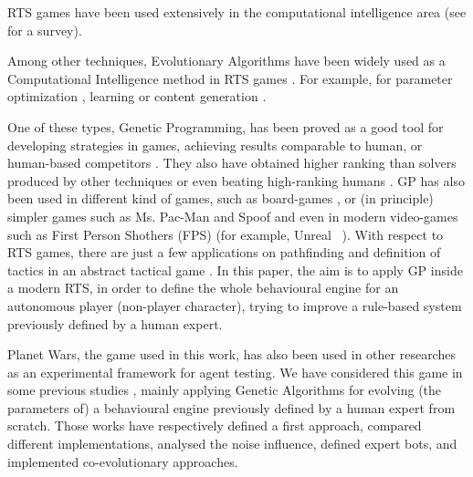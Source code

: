 \documentclass[preprint]{elsarticle}
\begin{document}
RTS games have been used extensively in the computational intelligence area (see \cite{Lara2013review} for a survey). 

Among other techniques, Evolutionary Algorithms have been widely used as a  Computational Intelligence method in RTS games \cite{Lara2013review}. For example, for parameter optimization \cite{Esparcia10FPS}, learning \cite{Kenneth2005neuroevolution} or content generation \cite{Mahlmann2012MapGeneration}. 

One of these types, Genetic Programming, has been proved as a good tool for developing strategies in games, achieving results comparable to human, or human-based competitors \cite{Sipper2007gameplaying}. They also have obtained higher ranking than solvers produced by other techniques or even beating high-ranking humans \cite{Elyasaf2012FreeCell}. GP has also been used in different kind of games, such as board-games \cite{Benbassat2012Reversi}, or (in principle) simpler games such as Ms. Pac-Man \cite{Brandstetter2012PacMan} and Spoof \cite{Wittkamp2007spoof} and even in modern video-games such as First Person Shothers (FPS) (for example, Unreal\texttrademark~ \cite{Esparcia2013GPunreal}). With respect to RTS games, there are just a few applications on pathfinding \cite{pathfinding_GP_RTS} and definition of tactics in an abstract tactical game \cite{KeaveneyO09_GP_RTS}.
In this paper, the aim is to apply GP inside a modern RTS, in order to define the whole behavioural engine for an autonomous player (non-player character), trying to improve a rule-based system previously defined by a human expert.
 
Planet Wars, the game used in this work, has also been used in other researches as an experimental framework for agent testing. 
We have considered this game in some previous studies \cite{Genebot-IWANN2011,Genebot_CEC11,genebot-evo12,ExpGenebot_CIG2012,Co-Genebot_EVO2014}, mainly applying Genetic Algorithms for evolving (the parameters of) a behavioural engine previously defined by a human expert from scratch. Those works have respectively defined a first approach, compared different implementations, analysed the noise influence, defined expert bots, and implemented co-evolutionary approaches.
\end{document}
